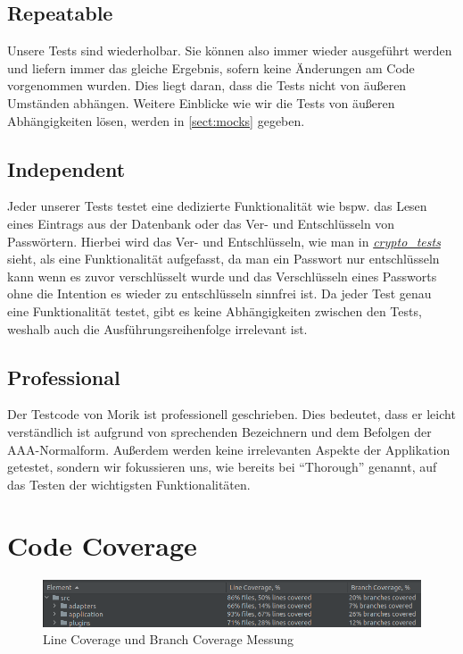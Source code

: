 \subsection{Repeatable}
Unsere Tests sind wiederholbar. Sie können also immer wieder ausgeführt werden und liefern immer das gleiche Ergebnis, sofern keine Änderungen am Code vorgenommen wurden. Dies liegt daran, dass die Tests nicht von äußeren Umständen abhängen. Weitere Einblicke wie wir die Tests von äußeren Abhängigkeiten lösen, werden in \autoref{sect:mocks} gegeben.

\subsection{Independent}
Jeder unserer Tests testet eine dedizierte Funktionalität wie bspw. das Lesen eines Eintrags aus der Datenbank oder das Ver- und Entschlüsseln von Passwörtern. Hierbei wird das Ver- und Entschlüsseln, wie man in \href{https://github.com/moorts/Morik/blob/main/src/tests/plugins/encryption/crypto_tests.cpp}{\textit{crypto\_tests}} sieht, als eine Funktionalität aufgefasst, da man ein Passwort nur entschlüsseln kann wenn es zuvor verschlüsselt wurde und das Verschlüsseln eines Passworts ohne die Intention es wieder zu entschlüsseln sinnfrei ist. Da jeder Test genau eine Funktionalität testet, gibt es keine Abhängigkeiten zwischen den Tests, weshalb auch die Ausführungsreihenfolge irrelevant ist.

\subsection{Professional}
Der Testcode von Morik ist professionell geschrieben. Dies bedeutet, dass er leicht verständlich ist aufgrund von sprechenden Bezeichnern und dem Befolgen der AAA-Normalform. Außerdem werden keine irrelevanten Aspekte der Applikation getestet, sondern wir fokussieren uns, wie bereits bei \enquote{Thorough} genannt, auf das Testen der wichtigsten Funktionalitäten.

\section{Code Coverage}
\label{sect:code_coverage}
\begin{figure}[ht]
	\centering
	\includegraphics[width=1.0\textwidth]{Bilder/coverage.png}
	\caption{Line Coverage und Branch Coverage Messung}
	\label{fig:coverage}
\end{figure}

